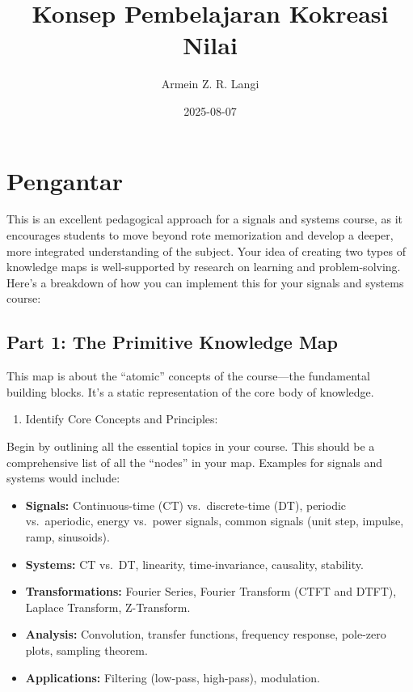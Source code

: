 \documentclass[
  letterpaper,
  DIV=11,
  numbers=noendperiod]{scrreprt}
\title{Konsep Pembelajaran Kokreasi Nilai}
\author{Armein Z. R. Langi}
\date{2025-08-07}
\providecommand{\tightlist}{%
  \setlength{\itemsep}{0pt}\setlength{\parskip}{0pt}}\usepackage{longtable,booktabs,array}
\renewcommand*\contentsname{Table of contents}
\newcommand\contentsname{Table of contents}
\begin{document}
\maketitle

\renewcommand*\contentsname{Table of contents}
{
\hypersetup{linkcolor=}
\setcounter{tocdepth}{2}
\tableofcontents
}


\chapter{Pengantar}\label{pengantar}

This is an excellent pedagogical approach for a signals and systems
course, as it encourages students to move beyond rote memorization and
develop a deeper, more integrated understanding of the subject. Your
idea of creating two types of knowledge maps is well-supported by
research on learning and problem-solving. Here's a breakdown of how you
can implement this for your signals and systems course:

\section{Part 1: The Primitive Knowledge
Map}\label{part-1-the-primitive-knowledge-map}

This map is about the ``atomic'' concepts of the course---the
fundamental building blocks. It's a static representation of the core
body of knowledge.

\begin{enumerate}
\def\labelenumi{\arabic{enumi}.}
\tightlist
\item
  Identify Core Concepts and Principles:
\end{enumerate}

Begin by outlining all the essential topics in your course. This should
be a comprehensive list of all the ``nodes'' in your map. Examples for
signals and systems would include:

\begin{itemize}
\item
  \textbf{Signals:} Continuous-time (CT) vs.~discrete-time (DT),
  periodic vs.~aperiodic, energy vs.~power signals, common signals (unit
  step, impulse, ramp, sinusoids).
\item
  \textbf{Systems:} CT vs.~DT, linearity, time-invariance, causality,
  stability.
\item
  \textbf{Transformations:} Fourier Series, Fourier Transform (CTFT and
  DTFT), Laplace Transform, Z-Transform.
\item
  \textbf{Analysis:} Convolution, transfer functions, frequency
  response, pole-zero plots, sampling theorem.
\item
  \textbf{Applications:} Filtering (low-pass, high-pass), modulation.
\end{itemize}
\end{document}
